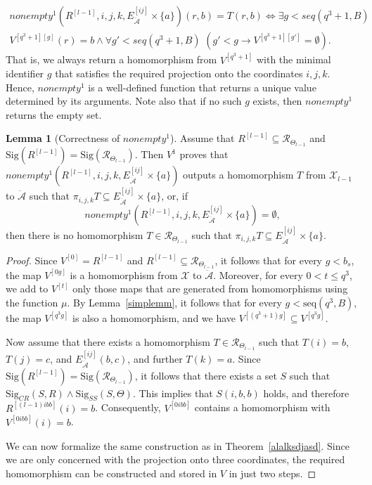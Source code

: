 \documentclass{article}
\theoremstyle{definition}
\theoremstyle{theorem}
\newtheorem{lem}{Lemma}
\theoremstyle{theorem}
\theoremstyle{remark}
\theoremstyle{remark}
\theoremstyle{example}
\theoremstyle{notation}
\theoremstyle{theorem}
\begin{document}
   \begin{equation*}
       \begin{gathered}
           nonempty^1(R^{[l-1]}, i,j,k, E^{[ij]}_{\ddot{\mathcal{A}}}\times\{a\})(r,b) = T(r,b)\iff \exists g<seq(q^3+1,B)\\
       V^{[q^3+1][g]}(r)=b \wedge \forall g'<seq(q^3+1,B)\,\, (g'<g \rightarrow V^{[q^3+1][g']} = \emptyset).
       \end{gathered}
   \end{equation*}
That is, we always return a homomorphism from $V^{[q^3+1]}$ with the minimal identifier $g$ that satisfies the required projection onto the coordinates $i, j, k$. Hence, $nonempty^1$ is a well-defined function that returns a unique value determined by its arguments. Note also that if no such $g$ exists, then $nonempty^1$ returns the empty set.
\begin{lem}[Correctness of $nonempty^1$]\label{djksfasgfljfsf}
Assume that $R^{[l-1]} \subseteq \mathscr{R}_{\Theta_{l-1}}$ and $\mathrm{Sig}(R^{[l-1]}) = \mathrm{Sig}(\mathscr{R}_{\Theta_{l-1}})$. Then 
$V^1$ proves that $nonempty^1(R^{[l-1]}, i, j, k, E^{[ij]}_{\ddot{\mathcal{A}}} \times \{a\})$ outputs a homomorphism $T$ from $\mathcal{X}_{l-1}$ to $\ddot{\mathcal{A}}$ such that $\pi_{i,j,k}T \subseteq E^{[ij]}_{\ddot{\mathcal{A}}} \times \{a\}$, or, if 
\[
nonempty^1(R^{[l-1]}, i, j, k, E^{[ij]}_{\ddot{\mathcal{A}}} \times \{a\}) = \emptyset,
\]
then there is no homomorphism $T \in \mathscr{R}_{\Theta_{l-1}}$ such that $\pi_{i,j,k}T \subseteq E^{[ij]}_{\ddot{\mathcal{A}}} \times \{a\}$.
\end{lem}
\begin{proof}
    Since $V^{[0]} = R^{[l-1]}$ and $R^{[l-1]} \subseteq \mathscr{R}_{\Theta_{l-1}}$, it follows that for every $g < b_s$, the map $V^{[0g]}$ is a homomorphism from $\mathcal{X}$ to $\ddot{\mathcal{A}}$. Moreover, for every $0 < t \leq q^3$, we add to $V^{[t]}$ only those maps that are generated from homomorphisms using the function $\mu$. By Lemma~\ref{simplemm}, it follows that for every $g < \mathrm{seq}(q^3, B)$, the map $V^{[q^3g]}$ is also a homomorphism, and we have $V^{[(q^3+1)g]} \subseteq V^{[q^3g]}$.

    Now assume that there exists a homomorphism $T \in \mathscr{R}_{\Theta_{l-1}}$ such that $T(i) = b$, $T(j) = c$, and $E^{[ij]}_{\ddot{\mathcal{A}}}(b, c)$, and further $T(k) = a$. Since $\mathrm{Sig}(R^{[l-1]}) = \mathrm{Sig}(\mathscr{R}_{\Theta_{l-1}})$, it follows that there exists a set $S$ such that $\mathrm{Sig}_{CR}(S, R) \wedge \mathrm{Sig}_{SS}(S, \Theta)$. This implies that $S(i, b, b)$ holds, and therefore $R^{[(l-1)ibb]}(i) = b$. Consequently, $V^{[0ibb]}$ contains a homomorphism with $V^{[0ibb]}(i) = b$.

We can now formalize the same construction as in Theorem~\ref{alalksdjasd}. Since we are only concerned with the projection onto three coordinates, the required homomorphism can be constructed and stored in $V$ in just two steps.

\end{proof}
\end{document}
